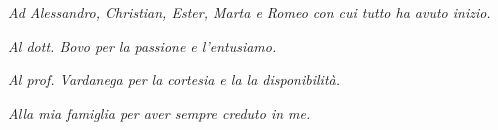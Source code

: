 \thispagestyle{empty}
{}

\vspace*{3cm}

\begin{flushright}
	\emph{Ad Alessandro, Christian, Ester, Marta e Romeo con cui tutto ha avuto inizio.}
	
	\emph{Al dott. Bovo per la passione e l'entusiamo.}
	
	\emph{Al prof. Vardanega per la cortesia e la la disponibilità.}
		
	\emph{Alla mia famiglia per aver sempre creduto in me.}
\end{flushright}
